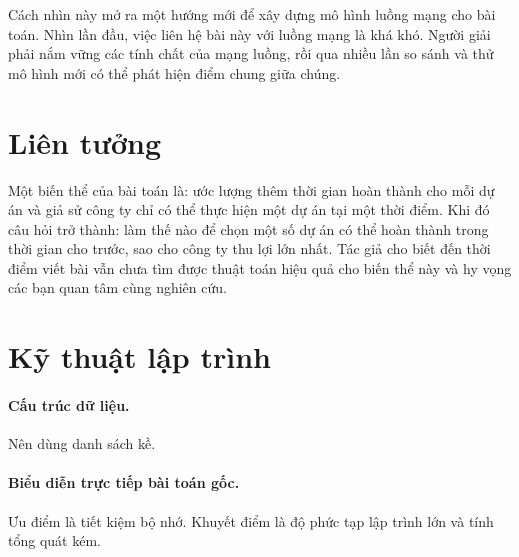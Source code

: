 \documentclass[11pt]{article}
\begin{document}
Cách nhìn này mở ra một hướng mới để xây dựng mô hình luồng mạng cho bài toán.
Nhìn lần đầu, việc liên hệ bài này với luồng mạng là khá khó. Người giải phải
nắm vững các tính chất của mạng luồng, rồi qua nhiều lần so sánh và thử mô
hình mới có thể phát hiện điểm chung giữa chúng.

\section{Liên tưởng}

Một biến thể của bài toán là: ước lượng thêm thời gian hoàn thành cho mỗi dự
án và giả sử công ty chỉ có thể thực hiện một dự án tại một thời điểm. Khi đó
câu hỏi trở thành: làm thế nào để chọn một số dự án có thể hoàn thành trong
thời gian cho trước, sao cho công ty thu lợi lớn nhất. Tác giả cho biết đến
thời điểm viết bài vẫn chưa tìm được thuật toán hiệu quả cho biến thể này và
hy vọng các bạn quan tâm cùng nghiên cứu.

\section{Kỹ thuật lập trình}

\paragraph{Cấu trúc dữ liệu.}
Nên dùng danh sách kề.

\paragraph{Biểu diễn trực tiếp bài toán gốc.}
Ưu điểm là tiết kiệm bộ nhớ. Khuyết điểm là độ phức tạp lập trình lớn và tính
tổng quát kém.
\end{document}
